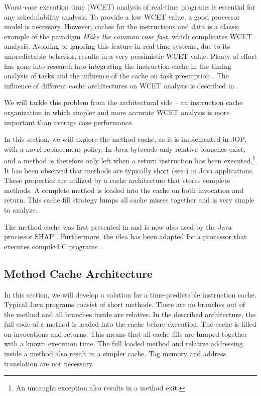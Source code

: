 
Worst-case execution time (WCET) analysis \cite{pusch:maxt:jnl} of
real-time programs is essential for any schedulability analysis. To
provide a low WCET value, a good processor model is necessary.
However, caches for the instructions and data is a classic example of
the paradigm \emph{Make the common case fast}, which complicates WCET
analysis. Avoiding or ignoring this feature in real-time systems, due
to its unpredictable behavior, results in a very pessimistic WCET
value. Plenty of effort has gone into research into integrating the
instruction cache in the timing analysis of tasks \cite{Arnold1994,
Healy1995, 225068} and the influence of the cache on task preemption
\cite{279589, Mataix:1996}. The influence of different cache
architectures on WCET analysis is described in
\cite{Heckmann:IEEE2003}.

We will tackle this problem from the architectural side -- an
instruction cache organization in which simpler and more accurate
WCET analysis is more important than average case performance.

In this section, we will explore the method cache, as it is
implemented in JOP, with a novel replacement policy. In Java bytecode
only relative branches exist, and a method is therefore only left
when a return instruction has been executed.\footnote{An uncaught
exception also results in a method exit.} It has been observed that
methods are typically short (see \cite{jop:thesis}) in Java
applications. These properties are utilized by a cache architecture
that stores complete methods. A complete method is loaded into the
cache on both invocation and return. This cache fill strategy lumps
all cache misses together and is very simple to analyze.

The method cache was first presented in \cite{jop:jtres_cache} and is
now also used by the Java processor SHAP \cite{shap:mcache}.
Furthermore, the idea has been adapted for a processor that executes
compiled C programs \cite{Metzlaff:SPM:2008}.

\subsection{Method Cache Architecture}

In this section, we will develop a solution for a time-predictable
instruction cache. Typical Java programs consist of short methods.
There are no branches out of the method and all branches inside are
relative. In the described architecture, the full code of a method is
loaded into the cache before execution. The cache is filled on
invocations and returns. This means that all cache fills are lumped
together with a known execution time. The full loaded method and
relative addressing inside a method also result in a simpler cache.
Tag memory and address translation are not necessary.

